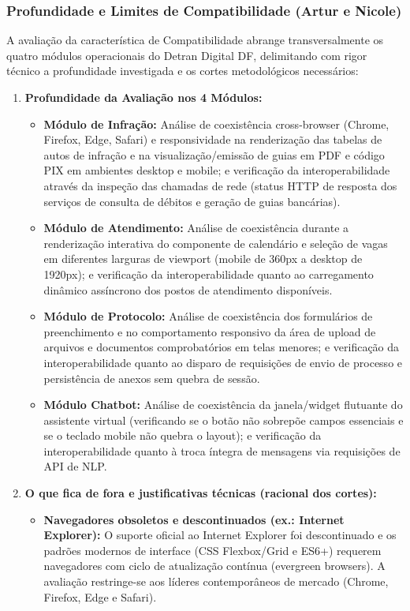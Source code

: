 \documentclass[12pt]{article}
\begin{document}
\subsubsection{Profundidade e Limites de Compatibilidade (Artur e Nicole)}
A avaliação da característica de Compatibilidade abrange transversalmente os quatro módulos operacionais do Detran Digital DF, delimitando com rigor técnico a profundidade investigada e os cortes metodológicos necessários:
\begin{enumerate}
    \item \textbf{Profundidade da Avaliação nos 4 Módulos:}
    \begin{itemize}
        \item \textbf{Módulo de Infração:} Análise de coexistência cross-browser (Chrome, Firefox, Edge, Safari) e responsividade na renderização das tabelas de autos de infração e na visualização/emissão de guias em PDF e código PIX em ambientes desktop e mobile; e verificação da interoperabilidade através da inspeção das chamadas de rede (status HTTP de resposta dos serviços de consulta de débitos e geração de guias bancárias).
        \item \textbf{Módulo de Atendimento:} Análise de coexistência durante a renderização interativa do componente de calendário e seleção de vagas em diferentes larguras de viewport (mobile de 360px a desktop de 1920px); e verificação da interoperabilidade quanto ao carregamento dinâmico assíncrono dos postos de atendimento disponíveis.
        \item \textbf{Módulo de Protocolo:} Análise de coexistência dos formulários de preenchimento e no comportamento responsivo da área de upload de arquivos e documentos comprobatórios em telas menores; e verificação da interoperabilidade quanto ao disparo de requisições de envio de processo e persistência de anexos sem quebra de sessão.
        \item \textbf{Módulo Chatbot:} Análise de coexistência da janela/widget flutuante do assistente virtual (verificando se o botão não sobrepõe campos essenciais e se o teclado mobile não quebra o layout); e verificação da interoperabilidade quanto à troca íntegra de mensagens via requisições de API de NLP.
    \end{itemize}
    \item \textbf{O que fica de fora e justificativas técnicas (racional dos cortes):}
    \begin{itemize}
        \item \textbf{Navegadores obsoletos e descontinuados (ex.: Internet Explorer):} O suporte oficial ao Internet Explorer foi descontinuado e os padrões modernos de interface (CSS Flexbox/Grid e ES6+) requerem navegadores com ciclo de atualização contínua (evergreen browsers). A avaliação restringe-se aos líderes contemporâneos de mercado (Chrome, Firefox, Edge e Safari).

\end{itemize}
\end{enumerate}
\end{document}
